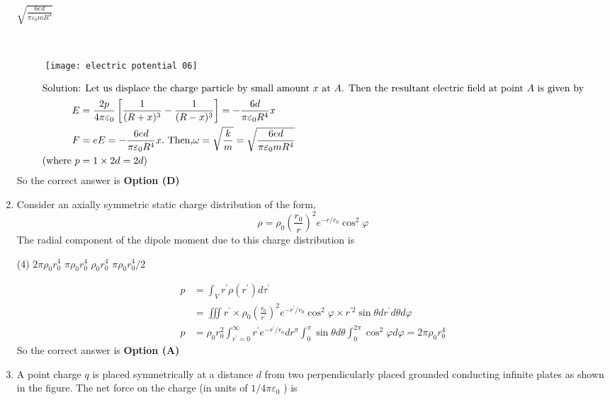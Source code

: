 \begin{enumerate}
\begin{tasks}
		\task[\textbf{D.}] $\sqrt{\frac{6 e d}{\pi \varepsilon_{0} m R^{4}}}$
	\end{tasks}
	\begin{answer}$\left. \right. $
		\begin{figure}[H]
			\centering
			\texttt{[image: electric potential 06]}
		\end{figure}
		\begin{align*}
		\intertext{Solution: Let us displace the charge particle by small amount $x$ at $A$. Then the resultant electric field at point $A$ is given by}
		E&=\frac{2 p}{4 \pi \varepsilon_{0}}\left[\frac{1}{(R+x)^{3}}-\frac{1}{(R-x)^{3}}\right]=-\frac{6 d}{\pi \varepsilon_{0} R^{4}} x\\
		F&=e E=-\frac{6 e d}{\pi \varepsilon_{0} R^{4}} x .\text{ Then,} \omega=\sqrt{\frac{k}{m}}=\sqrt{\frac{6 e d}{\pi \varepsilon_{0} m R^{4}}}\\
		(\text{where }p&=1 \times 2 d=2 d )
		\end{align*}
		So the correct answer is \textbf{Option (D)}
	\end{answer}
	\item Consider an axially symmetric static charge distribution of the form,
	$$
	\rho=\rho_{0}\left(\frac{r_{0}}{r}\right)^{2} e^{-r / r_{0}} \cos ^{2} \varphi
	$$
	The radial component of the dipole moment due to this charge distribution is
	{}
	\begin{tasks}(4)
		\task[\textbf{A.}] $2 \pi \rho_{0} r_{0}^{4}$
		\task[\textbf{B.}] $\pi \rho_{0} r_{0}^{4}$
		\task[\textbf{C.}] $\rho_{0} r_{0}^{4}$
		\task[\textbf{D.}] $\pi \rho_{0} r_{0}^{4} / 2$
	\end{tasks}
	\begin{answer}
		\begin{align*}
		p&=\int_{V} r^{\prime} \rho\left(r^{\prime}\right) d \tau^{\prime}\\&=\iiint r^{\prime} \times \rho_{0}\left(\frac{r_{0}}{r^{\prime}}\right)^{2} e^{-r^{\prime} / r_{0}} \cos ^{2} \varphi \times r^{\prime 2} \sin \theta d r^{\prime} d \theta d \varphi\\
		p&=\rho_{0} r_{0}^{2} \int_{r^{\prime}=0}^{\infty} r^{\prime} e^{-r^{\prime} / r_{0}} d r^{\pi} \int_{0}^{\pi} \sin \theta d \theta \int_{0}^{2 \pi} \cos ^{2} \varphi d \varphi=2 \pi \rho_{0} r_{0}^{4}
		\end{align*}
		So the correct answer is \textbf{Option (A)}
	\end{answer}
	\item A point charge $q$ is placed symmetrically at a distance $d$ from two perpendicularly placed grounded conducting infinite plates as shown in the figure. The net force on the charge (in units of $1 / 4 \pi \varepsilon_{0}$ ) is

\end{enumerate}
